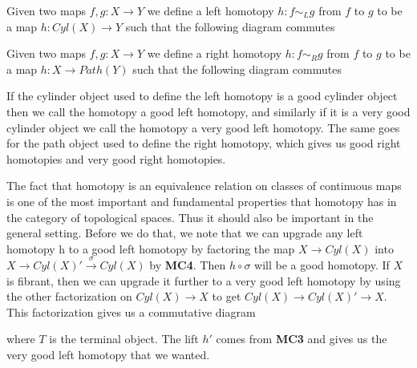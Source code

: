 \begin{definition}
Given two maps $f,g: X\rightarrow Y$ we define a left homotopy $h:f\sim_L g$ from $f$ to $g$ to be a map $h: Cyl(X)\rightarrow Y$ such that the following diagram commutes
\begin{center}
\end{center}
\end{definition}

\begin{definition}
Given two maps $f,g: X\rightarrow Y$ we define a right homotopy $h:f\sim_R g$ from $f$ to $g$ to be a map $h: X\rightarrow Path(Y)$ such that the following diagram commutes
\begin{center}
\end{center}
\end{definition}

If the cylinder object used to define the left homotopy is a good cylinder object then we call the homotopy a good left homotopy, and similarly if it is a very good cylinder object we call the homotopy a very good left homotopy. The same goes for the path object used to define the right homotopy, which gives us good right homotopies and very good right homotopies.

The fact that homotopy is an equivalence relation on classes of continuous maps is one of the most important and fundamental properties that homotopy has in the category of topological spaces. Thus it should also be important in the general setting. Before we do that, we note that we can upgrade any left homotopy h to a good left homotopy by factoring the map $X\rightarrow Cyl(X)$ into $X\rightarrow Cyl(X)' \overset{\sigma}\rightarrow Cyl(X)$ by \textbf{MC4}. Then $h\circ \sigma$ will be a good homotopy. If $X$ is fibrant, then we can upgrade it further to a very good left homotopy by using the other factorization on $Cyl(X)\rightarrow X$ to get $Cyl(X)\rightarrow Cyl(X)'\rightarrow X$. This factorization gives us a commutative diagram
\begin{center}
\end{center}
where $T$ is the terminal object. The lift $h'$ comes from \textbf{MC3} and gives us the very good left homotopy that we wanted. 

